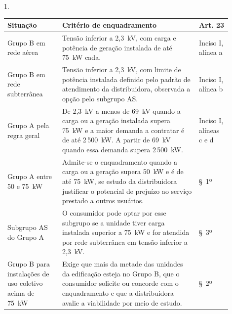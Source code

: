 \par\smallskip\noindent
\begin{minipage}{\linewidth}
  \centering
  \begin{Spacing}{1.}
    \label{qua:enquadramento-grupos}
  \end{Spacing}
  \vspace{0.7\baselineskip}
  {\small
  \renewcommand{\arraystretch}{1.2}
  \setlength{\tabcolsep}{4pt}
  \begin{tabular}{|>{\raggedright\arraybackslash}p{0.22\linewidth}|>{\raggedright\arraybackslash}p{0.55\linewidth}|>{\raggedright\arraybackslash}p{0.13\linewidth}|}
    \hline
    \textbf{Situação} & \textbf{Critério de enquadramento} & \textbf{Art. 23} \\\hline
    Grupo B em rede aérea &
    Tensão inferior a 2,3~kV, com carga e potência de geração instalada de até 75~kW cada. &
    Inciso I, alínea a \\\hline
    Grupo B em rede subterrânea &
    Tensão inferior a 2,3~kV, com limite de potência instalada definido pelo padrão de atendimento da distribuidora, observada a opção pelo subgrupo AS. &
    Inciso I, alínea b \\\hline
    Grupo A pela regra geral &
    De 2,3~kV a menos de 69~kV quando a carga ou a geração instalada supera 75~kW e a maior demanda a contratar é de até 2\,500~kW. A partir de 69~kV quando essa demanda supera 2\,500~kW. &
    Inciso I, alíneas c e d \\\hline
    Grupo A entre 50 e 75~kW &
    Admite-se o enquadramento quando a carga ou a geração supera 50~kW e é de até 75~kW, se estudo da distribuidora justificar o potencial de prejuízo ao serviço prestado a outros usuários. &
    §~1º \\\hline
    Subgrupo AS do Grupo A &
    O consumidor pode optar por esse subgrupo se a unidade tiver carga instalada superior a 75~kW e for atendida por rede subterrânea em tensão inferior a 2,3~kV. &
    §~3º \\\hline
    Grupo B para instalações de uso coletivo acima de 75~kW &
    Exige que mais da metade das unidades da edificação esteja no Grupo B, que o consumidor solicite ou concorde com o enquadramento e que a distribuidora avalie a viabilidade por meio de estudo. &
    §~2º \\\hline
  \end{tabular}}
\end{minipage}\par\smallskip


